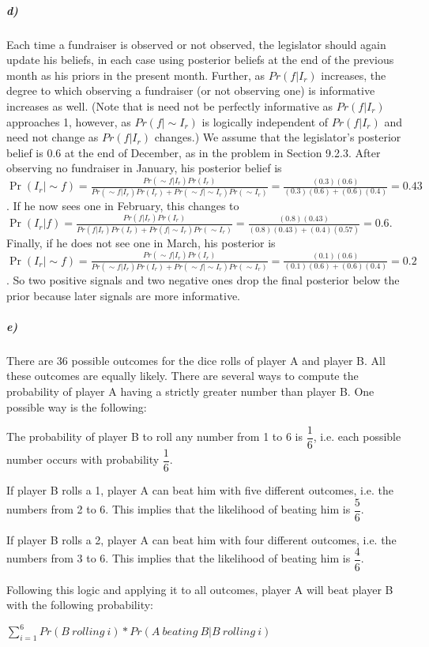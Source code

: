 \documentclass[12pt,letter]{article}\usepackage[]{graphicx}\usepackage[]{color}
\begin{document}
\subparagraph{d)} Each time a fundraiser is observed or not observed, the legislator should again update his beliefs, in each case using posterior beliefs at the end of the previous month as his priors in the present month. Further, as $Pr(f|I_r)$ increases, the degree to which observing a fundraiser (or not observing one) is informative increases as well. (Note that is need not be perfectly informative as $Pr(f|I_r)$ approaches 1, however, as $Pr(f|\sim I_r)$ is logically independent of $Pr(f|I_r)$ and need not change as $Pr(f|I_r)$ changes.) We assume that the legislator's posterior belief is $0.6$ at the end of December, as in the problem in Section 9.2.3.  After observing no fundraiser in January, his posterior belief is $\Pr(I_r|\sim f)=\frac{Pr(\sim f|I_r)Pr(I_r)}{Pr(\sim f|I_r)Pr(I_r)+Pr(\sim f|\sim I_r)Pr(\sim I_r)}=\frac{(0.3)(0.6)}{(0.3)(0.6)+(0.6)(0.4)}=0.43$. If he now sees one in February, this changes to $\Pr(I_r|f)=\frac{Pr(f|I_r)Pr(I_r)}{Pr(f|I_r)Pr(I_r)+Pr(f|\sim I_r)Pr(\sim I_r)}=\frac{(0.8)(0.43)}{(0.8)(0.43)+(0.4)(0.57)}=0.6$. Finally, if he does not see one in March, his posterior is $\Pr(I_r|\sim f)=\frac{Pr(\sim f|I_r)Pr(I_r)}{Pr(\sim f|I_r)Pr(I_r)+Pr(\sim f|\sim I_r)Pr(\sim I_r)}=\frac{(0.1)(0.6)}{(0.1)(0.6)+(0.6)(0.4)}=0.2$. So two positive signals and two negative ones drop the final posterior below the prior because later signals are more informative.

\subparagraph{e)} There are 36 possible outcomes for the dice rolls of player A and player B. All these outcomes are equally likely. There are several ways to compute the probability of player A having a strictly greater number than player B. One possible way is the following:

The probability of player B to roll any number from 1 to 6 is $\dfrac{1}{6}$, i.e. each possible number occurs with probability $\dfrac{1}{6}$.

If player B rolls a 1, player A can beat him with five different outcomes, i.e. the numbers from 2 to 6. This implies that the likelihood of beating him is $\dfrac{5}{6}$.

If player B rolls a 2, player A can beat him with four different outcomes, i.e. the numbers from 3 to 6. This implies that the likelihood of beating him is $\dfrac{4}{6}$.

\bigskip

Following this logic and applying it to all outcomes, player A will beat player B with the following probability:

$\sum_{i=1}^{6} Pr(B\ rolling\ i) * Pr (A\ beating\ B | B\ rolling\ i)$
\end{document}

